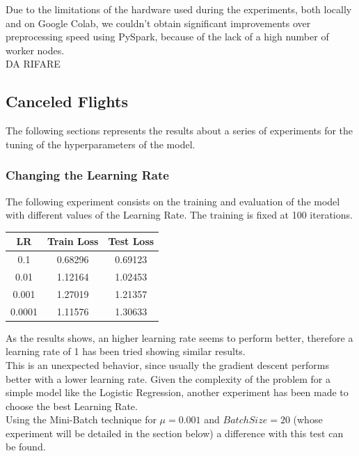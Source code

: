 \documentclass[
	letterpaper, %
	10pt, %
]{class}
\begin{document}
Due to the limitations of the hardware used during the experiments, both locally and on Google Colab, we couldn't obtain significant improvements over preprocessing speed using PySpark, because of the lack of a high number of worker nodes.\\
DA RIFARE

\subsection{Canceled Flights}

The following sections represents the results about a series of experiments for the tuning of the hyperparameters of the model.

\subsubsection{Changing the Learning Rate}

The following experiment consists on the training and evaluation of the model with different values of the Learning Rate. The training is fixed at 100 iterations.

\begin{center}
    \begin{tabular}{ |c|c|c| }
        \hline
        LR     & Train Loss & Test Loss \\
        \hline
        0.1    & 0.68296    & 0.69123   \\
        0.01   & 1.12164    & 1.02453   \\
        0.001  & 1.27019    & 1.21357   \\
        0.0001 & 1.11576    & 1.30633   \\
        \hline
    \end{tabular}
\end{center}

As the results shows, an higher learning rate seems to perform better, therefore a learning rate of 1 has been tried showing similar results.\\
This is an unexpected behavior, since usually the gradient descent performs better with a lower learning rate. Given the complexity of the problem for a simple model like the Logistic Regression, another experiment has been made to choose the best Learning Rate.\\

Using the Mini-Batch technique for $\mu=0.001$ and $Batch Size = 20$ (whose experiment will be detailed in the section below) a difference with this test can be found.
\end{document}
